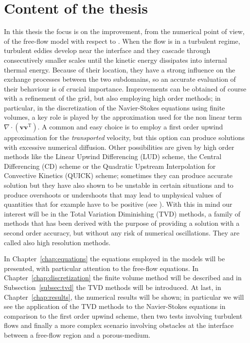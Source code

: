 \section{Content of the thesis}
In this thesis the focus is on the improvement, from the numerical point of view, of the free-flow model with respect to \cite{tesi:fetzer}. When the flow is in a turbulent regime, turbulent eddies develop near the interface and 
they cascade through consecutively smaller scales until the kinetic energy 
dissipates into internal thermal energy. Because of their location, they have 
a strong influence on the exchange processes between the two subdomains, so an 
accurate evaluation of their behaviour is of crucial importance. Improvements 
can be obtained of course with a refinement of the grid, but also employing 
high order methods; in 
particular, in the discretization of the Navier-Stokes equations using finite 
volumes, a key role is played by the approximation used for the non linear term 
$\nabla \cdot (\mathbf{v} \mathbf{v}^\mathrm{T})$. A common and easy 
choice is to employ a first order upwind approximation for the 
\emph{transported} velocity, but this option can produce solutions with 
excessive numerical diffusion. Other possibilities are given by high order 
methods 
like the Linear Upwind Differencing (LUD) scheme, the Central Differencing (CD) 
scheme or the Quadratic Upstream Interpolation for Convective Kinetics (QUICK) 
scheme; sometimes they can produce 
accurate solution but they have also shown to be unstable in certain 
situations and to produce overshoots or undershoots that 
may lead to unphysical values of quantities that for example have to be 
positive (see \cite{main:vermal}). With this in mind our interest will be in 
the Total Variation Diminishing (TVD) methods, a family of methods that has 
been derived with the purpose of providing a solution with a second order 
accuracy, but without any risk of numerical oscillations. They are called also 
high resolution methods.

In Chapter~\ref{chap:equations} the equations employed in the models will be 
presented, with particular attention to the free-flow equations. In 
Chapter~\ref{chap:discretization} the finite volume method will be described 
and in Subsection~\ref{subsec:tvd} the TVD methods will be introduced. At last, 
in Chapter~\ref{chap:results}, the numerical results will be shown; in 
particular we will see the application of the TVD methods to the Navier-Stokes 
equations in comparison to the first order upwind scheme, then two tests 
involving turbulent flows and finally a more complex scenario involving 
obstacles at the interface between a free-flow region and a porous-medium.

